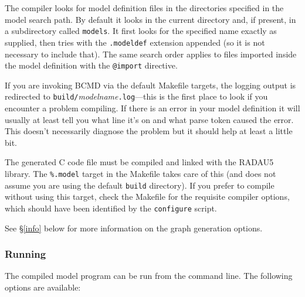 \documentclass[a4paper,11pt]{article}
\begin{document}
The compiler looks for model definition files in the directories specified in the model search path. By default it looks in the current directory and, if present, in a subdirectory called \texttt{models}. It first looks for the specified name exactly as supplied, then tries with the \texttt{.modeldef} extension appended (so it is not necessary to include that). The same search order applies to files imported inside the model definition with the \texttt{@import} directive.

If you are invoking BCMD via the default Makefile targets, the logging output is redirected to \texttt{build/}\textit{modelname}\texttt{.log}---this is the first place to look if you encounter a problem compiling. If there is an error in your model definition it will usually at least tell you what line it's on and what parse token caused the error. This doesn't necessarily diagnose the problem but it should help at least a little bit.

The generated C code file must be compiled and linked with the RADAU5 library. The \texttt{\%.model} target in the Makefile takes care of this (and does not assume you are using the default \texttt{build} directory). If you prefer to compile without using this target, check the Makefile for the requisite compiler options, which should have been identified by the \texttt{configure} script.

See \S\ref{info} below for more information on the graph generation options.

\subsubsection{Running}\label{runtime}

The compiled model program can be run from the command line. The following options are available:
\end{document}
